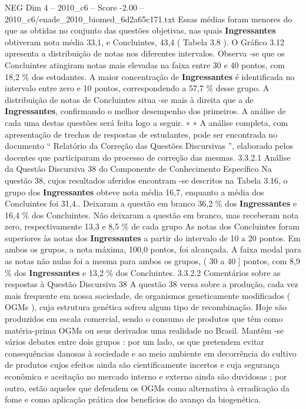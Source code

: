\begin{textsample}{NEG Dim 4 – 2010\_c6 – Score -2.00 – 2010\_c6/enade\_2010\_biomed\_6d2a65c171.txt}
Essas médias foram menores do que as obtidas no conjunto das questões objetivas, nas quais \textbf{Ingressantes} obtiveram nota média 33,1, e Concluintes, 43,4 ( Tabela 3.8 ).
O Gráfico 3.12 apresenta a distribuição de notas nos diferentes intervalos.
Observa -se que os Concluintes atingiram notas mais elevadas na faixa entre 30 e 40 pontos, com 18,2 \% dos estudantes.
A maior concentração de \textbf{Ingressantes} é identificada no intervalo entre zero e 10 pontos, correspondendo a 57,7 \% desse grupo.
A distribuição de notas de Concluintes situa -se mais à direita que a de \textbf{Ingressantes}, confirmando o melhor desempenho dos primeiros.
A análise de cada uma destas questões será feita logo a seguir. ∗ ∗ A análise completa, com apresentação de trechos de respostas de estudantes, pode ser encontrada no documento “ Relatório da Correção das Questões Discursivas ”, elaborado pelos docentes que participaram do processo de correção das mesmas. 3.3.2.1 Análise da Questão Discursiva 38 do Componente de Conhecimento Específico Na questão 38, cujos resultados aferidos encontram -se descritos na Tabela 3.16, o grupo dos \textbf{Ingressantes} obteve nota média 16,7, enquanto a média dos Concluintes foi 31,4..
Deixaram a questão em branco 36,2 \% dos \textbf{Ingressantes} e 16,4 \% dos Concluintes.
Não deixaram a questão em branco, mas receberam nota zero, respectivamente 13,3 e 8,5 \% de cada grupo As notas dos Concluintes foram superiores às notas dos \textbf{Ingressantes} a partir do intervalo de 10 a 20 pontos.
Em ambos os grupos, a nota máxima, 100,0 pontos, foi alcançada.
A faixa modal para as notas não nulas foi a mesma para ambos os grupos, ( 30 a 40 ] pontos, com 8,9 \% dos \textbf{Ingressantes} e 13,2 \% dos Concluintes. 3.3.2.2 Comentários sobre as respostas à Questão Discursiva 38 A questão 38 versa sobre a produção, cada vez mais frequente em nossa sociedade, de organismos geneticamente modificados ( OGMs ), cuja estrutura genética sofreu algum tipo de recombinação.
Hoje são produzidos em escala comercial, sendo o consumo de produtos que têm como matéria-prima OGMs ou seus derivados uma realidade no Brasil.
Mantêm -se vários debates entre dois grupos : por um lado, os que pretendem evitar consequências danosas à sociedade e ao meio ambiente em decorrência do cultivo de produtos cujos efeitos ainda são cientificamente incertos e cuja segurança econômica e aceitação no mercado interno e externo ainda são duvidosas ; por outro, estão aqueles que defendem os OGMs como alternativa à erradicação da fome e como aplicação prática dos benefícios do avanço da biogenética.

\end{textsample}
